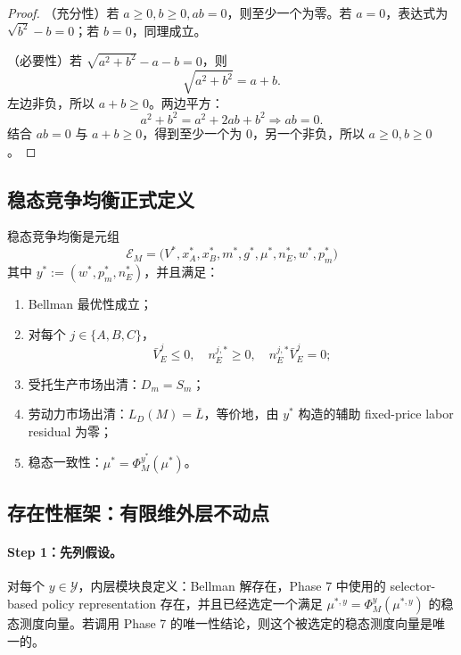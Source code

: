 \begin{proof}
（充分性）若 $a\ge0,b\ge0,ab=0$，则至少一个为零。若 $a=0$，表达式为 $\sqrt{b^2}-b=0$；若 $b=0$，同理成立。

（必要性）若 $\sqrt{a^2+b^2}-a-b=0$，则
\[
\sqrt{a^2+b^2}=a+b.
\]
左边非负，所以 $a+b\ge0$。两边平方：
\[
a^2+b^2=a^2+2ab+b^2\Rightarrow ab=0.
\]
结合 $ab=0$ 与 $a+b\ge0$，得到至少一个为 0，另一个非负，所以 $a\ge0,b\ge0$。
\end{proof}

\subsection{稳态竞争均衡正式定义}

\begin{definition}[制度 $M$ 下的稳态竞争均衡]
稳态竞争均衡是元组
\[
\mathcal E_M=\bigl(V^*,x_A^*,x_B^*,m^*,g^*,\mu^*,n_E^*,w^*,p_m^*\bigr)
\]
其中 $y^*:=(w^*,p_m^*,n_E^*)$，并且满足：
\begin{enumerate}
    \item Bellman 最优性成立；
    \item 对每个 $j\in\{A,B,C\}$，
    \[
    \bar V_E^j\le0,\quad n_E^{j,*}\ge0,\quad n_E^{j,*}\bar V_E^j=0;
    \]
    \item 受托生产市场出清：$D_m=S_m$；
    \item 劳动力市场出清：$L_D(M)=\bar L$，等价地，由 $y^*$ 构造的辅助 fixed-price labor residual 为零；
    \item 稳态一致性：$\mu^*=\Phi_M^{y^*}(\mu^*)$。
\end{enumerate}
\end{definition}

\subsection{存在性框架：有限维外层不动点}

\paragraph{Step 1：先列假设。}

\begin{assumption}[E1：内层模块可解]
对每个 $y\in\mathcal Y$，内层模块良定义：Bellman 解存在，Phase 7 中使用的 selector-based policy representation 存在，并且已经选定一个满足 $\mu^{*,y}=\Phi_M^y(\mu^{*,y})$ 的稳态测度向量。若调用 Phase 7 的唯一性结论，则这个被选定的稳态测度向量是唯一的。
\end{assumption}

